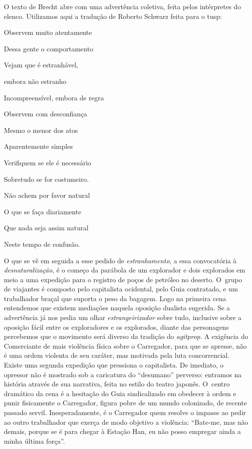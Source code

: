 O texto de Brecht abre com uma advertência coletiva, feita pelos
intérpretes do elenco. Utilizamos aqui a tradução de Roberto Schwarz
feita para o {\sc tusp}:

\startblockquote
Observem muito atentamente

Dessa gente o comportamento

Vejam que é estranhável,

embora não estranho

Incompreensível, embora de regra

Observem com desconfiança

Mesmo o menor dos atos

Aparentemente simples

Verifiquem se ele é necessário

Sobretudo se for costumeiro.

Não achem por favor natural

O que se faça diariamente

Que nada seja assim natural

Neste tempo de confusão.
\stopblockquote

O que se vê em seguida a esse pedido de {\it estranhamento}, a essa
convocatória à {\it desnaturalização}, é o começo da parábola de um
explorador e dois explorados em meio a uma expedição para o registro de
poços de petróleo no deserto. O~grupo de viajantes é composto pelo
capitalista ocidental, pelo Guia contratado, e um trabalhador braçal que
suporta o peso da bagagem. Logo na primeira cena entendemos que existem
mediações naquela oposição dualista sugerida. Se a advertência já nos
pedia um olhar {\it estrangeirizador} sobre tudo, inclusive sobre a oposição
fácil entre os exploradores e os explorados, diante das personagens
percebemos que o movimento será diverso da tradição do {\it agitprop}. A
exigência do Comerciante de mais violência física sobre o Carregador,
para que se apresse, não é uma ordem violenta de seu caráter, mas
motivada pela luta concorrencial. Existe uma segunda expedição que
pressiona o capitalista. De imediato, o opressor não é mostrado sob a
caricatura do “desumano” perverso: entramos na história através de sua
narrativa, feita no estilo do teatro japonês. O~centro dramático da cena
é a hesitação do Guia sindicalizado em obedecer à ordem e punir
fisicamente o Carregador, figura pobre de um mundo colonizado, de
recente passado servil. Inesperadamente, é o Carregador quem resolve o
impasse ao pedir ao outro trabalhador que exerça de modo objetivo a
violência: “Bate-me, mas não demais, porque se é para chegar à Estação
Han, eu não posso empregar ainda a minha última força”.

